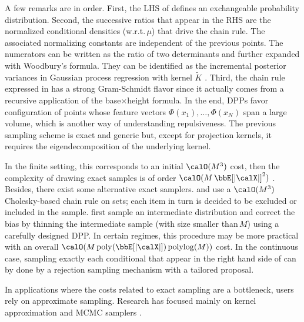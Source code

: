\documentclass[twoside,11pt]{article}
\begin{document}
        A few remarks are in order.
        First, the LHS of  defines an exchangeable probability distribution.
        Second, the successive ratios that appear in the RHS are the normalized conditional densities (w.r.t.\,$\mu$) that drive the chain rule.
        The associated normalizing constants are independent of the previous points.
        The numerators can be written as the ratio of two determinants and further expanded with Woodbury's formula.
        They can be identified as the incremental posterior variances in Gaussian process regression with kernel $\tilde{K}$ \citep[Equation 2.26]{RaWi06}.
        Third, the chain rule expressed in  has a strong Gram-Schmidt flavor since it actually comes from a recursive application of the base$\times$height formula.
        In the end, DPPs favor configuration of points whose feature vectors $\Phi(x_1),\dots, \Phi(x_N)$ span a large volume, which is another way of understanding repulsiveness.
        The previous sampling scheme is exact and generic but, except for projection kernels, it requires the eigendecomposition of the underlying kernel.

        In the finite setting, this corresponds to an initial $\calO(M^3)$ cost, then the complexity of drawing exact samples is of order $\calO(M\Expe{|\calX|}^2)$
        \citep[see, e.g.,][]{Gil14,TrBaAm18}.
        Besides, there exist some alternative exact samplers.
        \citet{Pou19} and  use a $\calO(M^3)$ Cholesky-based chain rule on sets; each item in turn is decided to be excluded or included in the sample.
         first sample an intermediate distribution and correct the bias by thinning the intermediate sample (with size smaller than\,$M$) using a carefully designed DPP.
        In certain regimes, this procedure may be more practical with an overall
        $\calO(M\operatorname{poly}(\Expe{|\calX|})\operatorname{polylog}(M))$ cost.
        In the continuous case, sampling exactly each conditional that appear in the right hand side of  can by done by a rejection sampling mechanism with a tailored proposal.

        In applications where the costs related to exact sampling are a bottleneck, users rely on approximate sampling.
        Research has focused mainly on kernel approximation \citep{AKFT13} and MCMC samplers \citep{AnGhRe16, LiJeSr16c, GaBaVa17}.
\end{document}
